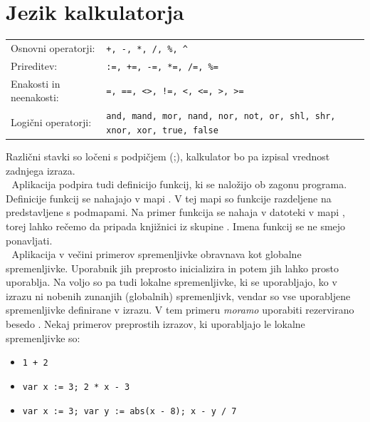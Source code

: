\documentclass[12pt,titlepage]{report}
\makeatletter
\newcommand{\wdot}{\textcolor{white}{.}}
\newcommand{\odstavek}{\wdot \\ \wdot \qquad}
\newcommand{\codequote}[1]{\textquote{\texttt{#1}}}
\newcommand{\group}[2]{\parbox{#1}{\setstretch{0.5}\vspace{5pt}\texttt{#2}\vspace{5pt}}}
\newenvironment{alignitemize}
{

\begin{tabular}{@{$\bullet$ }ll}
}{
\end{tabular}

}
\makeatother
\begin{document}
	\section{Jezik kalkulatorja\cite{exprtk_git}}
		\begin{alignitemize}
			Osnovni operatorji: &\texttt{+, -, *, /, \%, \^{}} \\
			Prireditev: &\texttt{:=, +=, -=, *=, /=, \%=}\\
			Enakosti in neenakosti: &\texttt{=, ==, <>, !=, <, <=, >, >=}\\
			Logični operatorji: &\group{225pt}{and, mand, mor, nand, nor, not, or, shl, shr, xnor, xor, true, false}\\
			Funkcije: &\group{375pt}{abs, avg, ceil, clamp, equal, erf, erfc, exp, expm1, floor, frac, log, log10, log1p, log2, logn, max, min, mul,  ncdf, nequal, root, round, roundn, sgn, sqrt, sum, swap, trunc}\\
			Trigonometrija: &\group{330pt}{acos, acosh, asin, asinh, atan, atanh, atan2, cos, cosh, cot, csc, sec, sin, sinc, sinh, tan, tanh, hypot, rad2deg, deg2grad, deg2rad, grad2deg}\\
			Nadzor pretoka: &\group{250pt}{if-then-else, trojiški pogojni operator (?:), switch-case, return}\\
			Zanke: &\texttt{while, for, repeat-until, break, continue}
		\end{alignitemize}
		Različni stavki so ločeni s podpičjem (;), kalkulator bo pa izpisal vrednost zadnjega izraza.
		\odstavek
		Aplikacija podpira tudi definicijo funkcij, ki se naložijo ob zagonu programa.
		Definicije funkcij se nahajajo v mapi .
		V tej mapi so funkcije razdeljene na  predstavljene s podmapami.
		Na primer funkcija \codequote{add} se nahaja v datoteki  v mapi , torej lahko rečemo da pripada knjižnici  iz skupine .
		Imena funkcij se ne smejo ponavljati.
		\odstavek
		Aplikacija v večini primerov spremenljivke obravnava kot globalne spremenljivke. Uporabnik jih preprosto inicializira \codequote{x := 3} in potem jih lahko prosto uporablja.
		Na voljo so pa tudi lokalne spremenljivke, ki se uporabljajo, ko v izrazu ni nobenih zunanjih (globalnih) spremenljivk, vendar so vse uporabljene spremenljivke definirane v izrazu. V tem primeru \emph{moramo} uporabiti rezervirano besedo \codequote{var}. Nekaj primerov preprostih izrazov, ki uporabljajo le lokalne spremenljivke so:
		\begin{itemize}
			\item \texttt{1 + 2}
			\item \texttt{var x := 3; 2 * x - 3}
			\item \texttt{var x := 3; var y := abs(x - 8); x - y / 7}
		\end{itemize}
\end{document}
